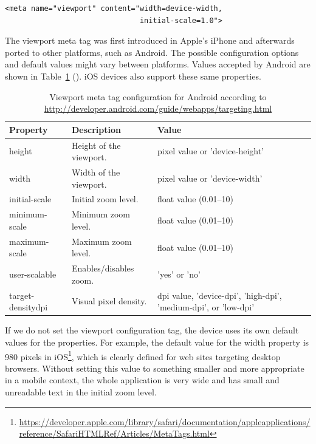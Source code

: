 \begin{verbatim}
<meta name="viewport" content="width=device-width,
                               initial-scale=1.0">
\end{verbatim}

The viewport meta tag was first introduced in Apple's iPhone and
afterwards ported to other platforms, such as Android. The possible
configuration options and default values might vary between
platforms. Values accepted by Android are shown in
Table~\ref{table:viewport-meta} (). iOS
devices also support these same properties.

\begin{table}
  \begin{tabular}{ l | l | p{5cm} }
    \textbf{Property} & \textbf{Description} & \textbf{Value} \\ \hline
    height & Height of the viewport. & pixel value or 'device-height' \\
    width & Width of the viewport. & pixel value or 'device-width' \\
    initial-scale & Initial zoom level. & float value (0.01--10) \\
    minimum-scale & Minimum zoom level. & float value (0.01--10) \\
    maximum-scale & Maximum zoom level. & float value (0.01--10) \\
    user-scalable & Enables/disables zoom. & 'yes' or 'no' \\
    target-densitydpi & Visual pixel density. & dpi value, 'device-dpi', 'high-dpi', 'medium-dpi', or 'low-dpi' \\
  \end{tabular}
  \label{table:viewport-meta}
  \caption{Viewport meta tag configuration for Android according to
    \url{http://developer.android.com/guide/webapps/targeting.html}}
\end{table}

If we do not set the viewport configuration tag, the device uses its
own default values for the properties. For example, the default value
for the width property is 980 pixels in
iOS\footnote{\url{https://developer.apple.com/library/safari/documentation/appleapplications/reference/SafariHTMLRef/Articles/MetaTags.html}},
which is clearly defined for web sites targeting desktop
browsers. Without setting this value to something smaller and more
appropriate in a mobile context, the whole application is very wide
and has small and unreadable text in the initial zoom level.

